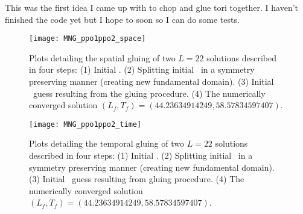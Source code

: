 \begin{description}
{\begin{description}
This was the first idea I came up with to chop and glue tori together. I haven't
finished the code yet but I hope to soon so I can do some tests.
\end{description}

}

\begin{figure}
\centering
\begin{minipage}[height=.1\textheight]{.8\textwidth}
\texttt{[image: MNG\_ppo1ppo2\_space]}
\end{minipage}
\caption{ \label{fig:MNG-ppo1plus2-space}
Plots detailing the spatial gluing of two $L=22$ solutions described in four
steps: (1) Initial \twots. (2) Splitting initial
\twots\ in a symmetry preserving manner (creating new fundamental domain).
(3) Initial \twot\ guess resulting from the gluing procedure. (4) The numerically
converged solution $(L_f,T_f) = (44.23634914249,58.57834597407)$.
}
\end{figure}

\begin{figure}
\centering
\begin{minipage}[height=.1\textheight]{.8\textwidth}
\texttt{[image: MNG\_ppo1ppo2\_time]}
\end{minipage}
\caption{ \label{fig:MNG-ppo1plus2-time}
Plots detailing the temporal gluing of two $L=22$ solutions described in four
steps: (1) Initial \twots. (2) Splitting initial
\twots\ in a symmetry preserving manner (creating new fundamental domain).
(3) Initial \twot\ guess resulting from gluing procedure. (4) The numerically
converged solution $(L_f,T_f) = (44.23634914249,58.57834597407)$.
}
\end{figure}

\end{description}
